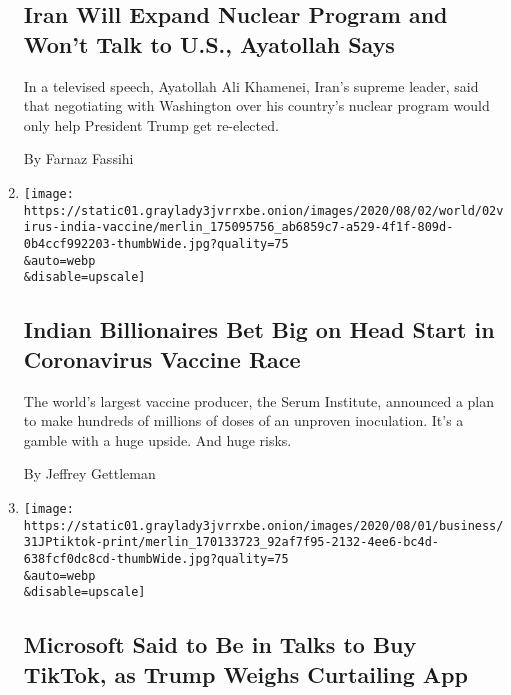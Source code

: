\begin{enumerate}
  \hypertarget{iran-will-expand-nuclear-program-and-wont-talk-to-us-ayatollah-says}{%
  \subsection{Iran Will Expand Nuclear Program and Won't Talk to U.S.,
  Ayatollah
  Says}\label{iran-will-expand-nuclear-program-and-wont-talk-to-us-ayatollah-says}}

  In a televised speech, Ayatollah Ali Khamenei, Iran's supreme leader,
  said that negotiating with Washington over his country's nuclear
  program would only help President Trump get re-elected.

  By Farnaz Fassihi
\item
  \href{/2020/08/01/world/asia/coronavirus-vaccine-india.html}{}

  \texttt{[image: https://static01.graylady3jvrrxbe.onion/images/2020/08/02/world/02virus-india-vaccine/merlin\_175095756\_ab6859c7-a529-4f1f-809d-0b4ccf992203-thumbWide.jpg?quality=75\\\&auto=webp\\\&disable=upscale]}

  \hypertarget{indian-billionaires-bet-big-on-head-start-in-coronavirus-vaccine-race}{%
  \subsection{Indian Billionaires Bet Big on Head Start in Coronavirus
  Vaccine
  Race}\label{indian-billionaires-bet-big-on-head-start-in-coronavirus-vaccine-race}}

  The world's largest vaccine producer, the Serum Institute, announced a
  plan to make hundreds of millions of doses of an unproven inoculation.
  It's a gamble with a huge upside. And huge risks.

  By Jeffrey Gettleman
\item
  \href{/2020/07/31/technology/tiktok-microsoft.html}{}

  \texttt{[image: https://static01.graylady3jvrrxbe.onion/images/2020/08/01/business/31JPtiktok-print/merlin\_170133723\_92af7f95-2132-4ee6-bc4d-638fcf0dc8cd-thumbWide.jpg?quality=75\\\&auto=webp\\\&disable=upscale]}

  \hypertarget{microsoft-said-to-be-in-talks-to-buy-tiktok-as-trump-weighs-curtailing-app}{%
  \subsection{Microsoft Said to Be in Talks to Buy TikTok, as Trump
  Weighs Curtailing
  App}\label{microsoft-said-to-be-in-talks-to-buy-tiktok-as-trump-weighs-curtailing-app}}


\end{enumerate}
